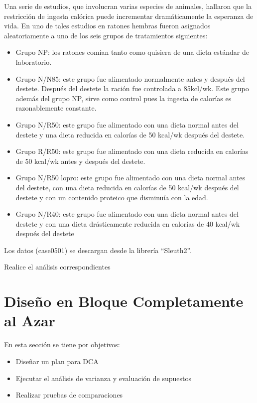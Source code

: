 \documentclass[]{book}
\providecommand{\tightlist}{%
  \setlength{\itemsep}{0pt}\setlength{\parskip}{0pt}}
\begin{document}
Una serie de estudios, que involucran varias especies de animales,
hallaron que la restricción de ingesta calórica puede incrementar
dramáticamente la esperanza de vida. En uno de tales estudios en ratones
hembras fueron asignados aleatoriamente a uno de los seis grupos de
tratamientos siguientes:

\begin{itemize}
\tightlist
\item
  Grupo NP: los ratones comían tanto como quisiera de una dieta estándar
  de laboratorio.
\item
  Grupo N/N85: este grupo fue alimentado normalmente antes y después del
  destete. Después del destete la ración fue controlada a 85kcl/wk. Este
  grupo además del grupo NP, sirve como control pues la ingesta de
  calorías es razonablemente constante.
\item
  Grupo N/R50: este grupo fue alimentado con una dieta normal antes del
  destete y una dieta reducida en calorías de 50 kcal/wk después del
  destete.
\item
  Grupo R/R50: este grupo fue alimentado con una dieta reducida en
  calorías de 50 kcal/wk antes y después del destete.
\item
  Grupo N/R50 lopro: este grupo fue alimentado con una dieta normal
  antes del destete, con una dieta reducida en calorías de 50 kcal/wk
  después del destete y con un contenido proteico que disminuía con la
  edad.
\item
  Grupo N/R40: este grupo fue alimentado con una dieta normal antes del
  destete y con una dieta drásticamente reducida en calorías de 40
  kcal/wk después del destete
\end{itemize}

Los datos (case0501) se descargan desde la librería ``Sleuth2''.

Realice el análisis correspondientes

\chapter{Diseño en Bloque Completamente al
Azar}\label{diseno-en-bloque-completamente-al-azar}

En esta sección se tiene por objetivos:

\begin{itemize}
\tightlist
\item
  Diseñar un plan para DCA
\item
  Ejecutar el análisis de varianza y evaluación de supuestos
\item
  Realizar pruebas de comparaciones
\end{itemize}
\end{document}
